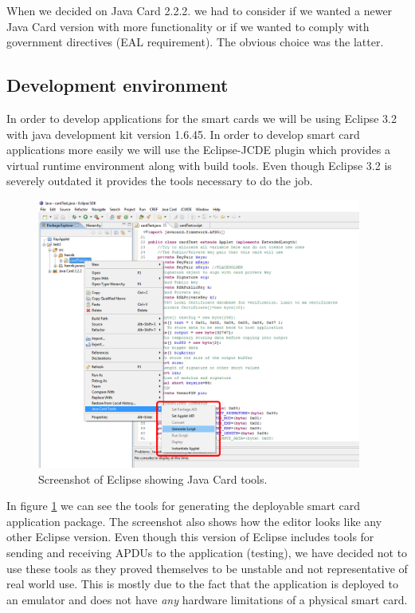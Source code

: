 When we decided on Java Card 2.2.2. we had to consider if we wanted a newer Java Card version with more functionality or if we wanted to comply with government directives (EAL requirement). The obvious choice was the latter.

\subsection{Development environment}
In order to develop applications for the smart cards we will be using Eclipse 3.2 with java development kit version 1.6.45. In order to develop smart card applications more easily we will use the Eclipse-JCDE plugin \cite{eclipseJCDE} which provides a virtual runtime environment along with build tools. Even though Eclipse 3.2 is severely outdated it provides the tools necessary to do the job.

\begin{figure}[h!]
  \caption{Screenshot of Eclipse showing Java Card tools.}
  \label{fig:eclipse}
  \centering
    \includegraphics[width=0.95\textwidth]{images/eclipse.png}
\end{figure}

In figure \ref{fig:eclipse} we can see the tools for generating the deployable smart card application package. The screenshot also shows how the editor looks like any other Eclipse version. Even though this version of Eclipse includes tools for sending and receiving APDUs to the application (testing), we have decided not to use these tools as they proved themselves to be unstable and not representative of real world use. This is mostly due to the fact that the application is deployed to an emulator and does not have \textit{any} hardware limitations of a physical smart card.

